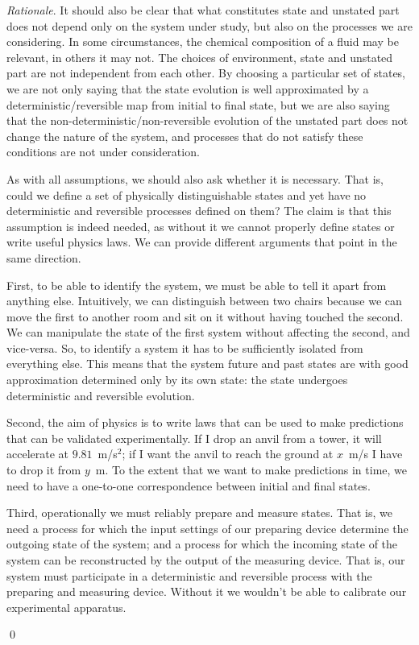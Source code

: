 \documentclass[aps,pra,10pt,twocolumn,floatfix,nofootinbib]{revtex4-1}
\theoremstyle{definition}
\newenvironment{rationale}{\emph{Rationale}.}{\qed}
\begin{document}
\begin{rationale}
It should also be clear that what constitutes state and unstated part does not depend only on the system under study, but also on the processes we are considering. In some circumstances, the chemical composition of a fluid may be relevant, in others it may not. The choices of environment, state and unstated part are not independent from each other. By choosing a particular set of states, we are not only saying that the state evolution is well approximated by a deterministic/reversible map from initial to final state, but we are also saying that the non-deterministic/non-reversible evolution of the unstated part does not change the nature of the system, and processes that do not satisfy these conditions are not under consideration.

As with all assumptions, we should also ask whether it is necessary. That is, could we define a set of physically distinguishable states and yet have no deterministic and reversible processes defined on them? The claim is that this assumption is indeed needed, as without it we cannot properly define states or write useful physics laws. We can provide different arguments that point in the same direction.

First, to be able to identify the system, we must be able to tell it apart from anything else. Intuitively, we can distinguish between two chairs because we can move the first to another room and sit on it without having touched the second. We can manipulate the state of the first system without affecting the second, and vice-versa. So, to identify a system it has to be sufficiently isolated from everything else. This means that the system future and past states are with good approximation determined only by its own state: the state undergoes deterministic and reversible evolution.

Second, the aim of physics is to write laws that can be used to make predictions that can be validated experimentally. If I drop an anvil from a tower, it will accelerate at $9.81$~m/s$^2$; if I want the anvil to reach the ground at $x$~m/s I have to drop it from $y$~m. To the extent that we want to make predictions in time, we need to have a one-to-one correspondence between initial and final states.

Third, operationally we must reliably prepare and measure states. That is, we need a process for which the input settings of our preparing device determine the outgoing state of the system; and a process for which the incoming state of the system can be reconstructed by the output of the measuring device. That is, our system must participate in a deterministic and reversible process with the preparing and measuring device. Without it we wouldn't be able to calibrate our experimental apparatus.


\end{rationale}
\end{document}
